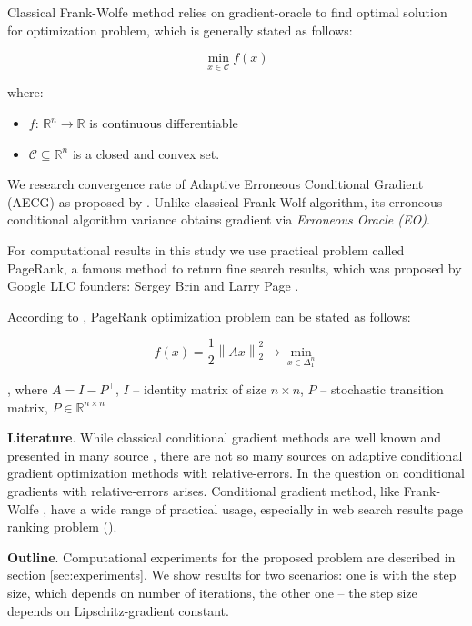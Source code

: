 \documentclass[runningheads, final]{llncs}
\newcommand{\norm}[1]{\left\lVert#1\right\rVert}
\begin{document}
Classical Frank-Wolfe method relies on gradient-oracle to find optimal solution
for optimization problem, which is generally stated as follows:

\begin{equation}\label{eq:optimization}
    \min_{x \in \mathcal{C}} f(x)
\end{equation}

where:

\begin{itemize}
    \item $f$: $\mathbb{R}^n \rightarrow \mathbb{R}$ is continuous
          differentiable
    \item $\mathcal{C} \subseteq \mathbb{R}^n$ is a closed and convex set.
\end{itemize}

We research convergence rate of Adaptive Erroneous Conditional Gradient (AECG)
as proposed by \cite{hallak:2024}.
Unlike classical Frank-Wolf algorithm, its erroneous-conditional algorithm
variance obtains gradient via \textit{Erroneous Oracle (EO)}.

For computational results in this study we use practical problem called
PageRank, a famous method to return fine search results, which was proposed by
Google LLC founders: Sergey Brin and Larry Page \cite{brin:2012}.

According to \cite{anikin:2022}, PageRank optimization problem can be stated
as follows:

\begin{equation}
    f(x) = \frac{1}{2}\norm{Ax}_2^2 \to \min_{x\in\Delta^n_{1}}
\end{equation}

, where $A = I - P^\intercal$, $I$ -- identity matrix of size $n\times n$,
$P$ -- stochastic transition matrix, $P \in \mathbb{R}^{n\times n}$

\textbf{Literature}. While classical conditional gradient methods are well known
and presented in many source \cite{dvurechensky:2015,dvurechensky:2017}, there
are not so many sources on adaptive conditional gradient optimization methods
with relative-errors. In \cite{hallak:2024} the question on conditional
gradients with relative-errors arises. Conditional gradient method,
like Frank-Wolfe \cite{frankwolfe:1956}, have a wide range of practical usage,
especially in web search results page ranking problem (\cite{anikin:2022}).

\textbf{Outline}. Computational experiments for the proposed problem are
described in section \ref{sec:experiments}. We show results for two scenarios:
one is with the step size, which depends on number of iterations, the other one
-- the step size depends on Lipschitz-gradient constant.
\end{document}

